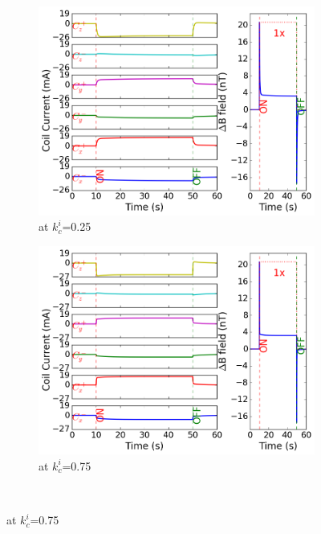 \begin{figure}[!htb]
    \begin{subfigure}{.5\linewidth}
        \centering
        \includegraphics[width=\linewidth, height= 6.5 cm]{Images/i25_33}
        \caption{at $k_c^i$=0.25}
        \label{fig:i25}
    \end{subfigure}%
    \begin{subfigure}{.5\linewidth}
        \centering
        \includegraphics[width=\linewidth, height= 6.5 cm]{Images/i75_33}
        \caption{at $k_c^i$=0.75}
        \label{fig:i50}
    \end{subfigure}\\[1ex]

\end{figure}
